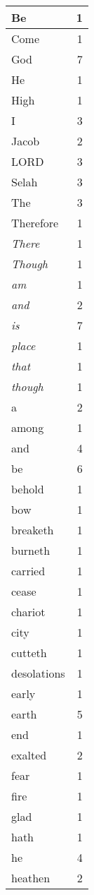 \begin{center}
\begin{longtable}{l|r}
\hline \hline
\endlastfoot
Be & 1 \\ \hline
Come & 1 \\ \hline
God & 7 \\ \hline
He & 1 \\ \hline
High & 1 \\ \hline
I & 3 \\ \hline
Jacob & 2 \\ \hline
LORD & 3 \\ \hline
Selah & 3 \\ \hline
The & 3 \\ \hline
Therefore & 1 \\ \hline
\emph{There} & 1 \\ \hline
\emph{Though} & 1 \\ \hline
\emph{am} & 1 \\ \hline
\emph{and} & 2 \\ \hline
\emph{is} & 7 \\ \hline
\emph{place} & 1 \\ \hline
\emph{that} & 1 \\ \hline
\emph{though} & 1 \\ \hline
a & 2 \\ \hline
among & 1 \\ \hline
and & 4 \\ \hline
be & 6 \\ \hline
behold & 1 \\ \hline
bow & 1 \\ \hline
breaketh & 1 \\ \hline
burneth & 1 \\ \hline
carried & 1 \\ \hline
cease & 1 \\ \hline
chariot & 1 \\ \hline
city & 1 \\ \hline
cutteth & 1 \\ \hline
desolations & 1 \\ \hline
early & 1 \\ \hline
earth & 5 \\ \hline
end & 1 \\ \hline
exalted & 2 \\ \hline
fear & 1 \\ \hline
fire & 1 \\ \hline
glad & 1 \\ \hline
hath & 1 \\ \hline
he & 4 \\ \hline
heathen & 2 \\ \hline

\end{longtable}
\end{center}
